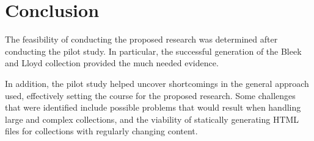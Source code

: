 \section{Conclusion}
\label{sec:pilot-study:summary}

The feasibility of conducting the proposed research was determined after
conducting the pilot study. In particular, the successful generation of the
Bleek and Lloyd collection provided the much needed evidence.

In addition, the pilot study helped uncover shortcomings in the general
approach used, effectively setting the course for the proposed research. Some
challenges that were identified include possible problems that would result
when handling large and complex collections, and the viability of statically
generating HTML files for collections with regularly changing content.
